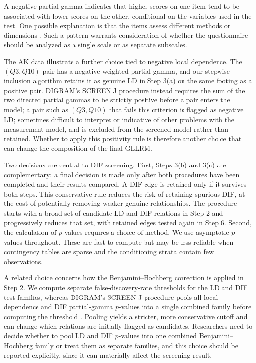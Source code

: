 \documentclass[12pt]{article}
\theoremstyle{examplestyle}
\begin{document}
A negative partial gamma indicates that higher scores on one item tend to be associated with lower scores on the other, conditional on the variables used in the test. One possible explanation is that the items assess different methods or dimensions \citep{kreiner-christensen-2004}. Such a pattern warrants consideration of whether the questionnaire should be analyzed as a single scale or as separate subscales.

The AK data illustrate a further choice tied to negative local dependence. The $(Q3,Q10)$ pair has a negative weighted partial gamma, and our stepwise inclusion algorithm retains it as genuine LD in Step 3(a) on the same footing as a positive pair. DIGRAM's SCREEN J procedure instead requires the sum of the two directed partial gammas to be strictly positive before a pair enters the model; a pair such as $(Q3,Q10)$ that fails this criterion is flagged as negative LD; sometimes difficult to interpret or indicative of other problems with the measurement model, and is excluded from the screened model rather than retained. Whether to apply this positivity rule is therefore another choice that can change the composition of the final GLLRM.

Two decisions are central to DIF screening. First, Steps 3(b) and 3(c) are complementary: a final decision is made only after both procedures have been completed and their results compared. A DIF edge is retained only if it survives both steps. This conservative rule reduces the risk of retaining spurious DIF, at the cost of potentially removing weaker genuine relationships. The procedure starts with a broad set of candidate LD and DIF relations in Step 2 and progressively reduces that set, with retained edges tested again in Step 6. Second, the calculation of $p$-values requires a choice of method. We use asymptotic $p$-values throughout. These are fast to compute but may be less reliable when contingency tables are sparse and the conditioning strata contain few observations.

A related choice concerns how the Benjamini--Hochberg correction is applied in Step 2. We compute separate false-discovery-rate thresholds for the LD and DIF test families, whereas DIGRAM's SCREEN J procedure pools all local-dependence and DIF partial-gamma $p$-values into a single combined family before computing the threshold \citep{kreiner-christensen-2011}. Pooling yields a stricter, more conservative cutoff and can change which relations are initially flagged as candidates. Researchers need to decide whether to pool LD and DIF $p$-values into one combined Benjamini--Hochberg family or treat them as separate families, and this choice should be reported explicitly, since it can materially affect the screening result.
\end{document}
